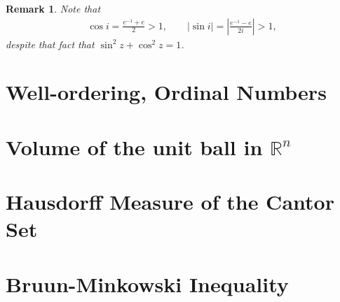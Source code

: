\documentclass[11pt]{book}
\newtheorem{remark}{Remark}[chapter]
\theoremstyle{definition}
\numberwithin{equation}{chapter}
\begin{document}
\begin{remark}
Note that 
\begin{align*}
    \cos i = \frac{e^{-1} + e}{2} > 1, \qquad \left|\sin i\right| = \left|\frac{e^{-1} - e}{2i}\right| > 1,
\end{align*}
despite that fact that $\sin^2 z + \cos ^2 z = 1$.
\end{remark}

\medskip








%






\begin{appendices}
\chapter{Well-ordering, Ordinal Numbers}\label{appendix_a}



\chapter{Volume of the unit ball in $\mathbb{R}^n$}\label{appendix_b}



\chapter{Hausdorff Measure of the Cantor Set}\label{appendix_c}



\chapter{Bruun-Minkowski Inequality}\label{appendix_d}




\end{appendices}

\newpage


\end{document}
